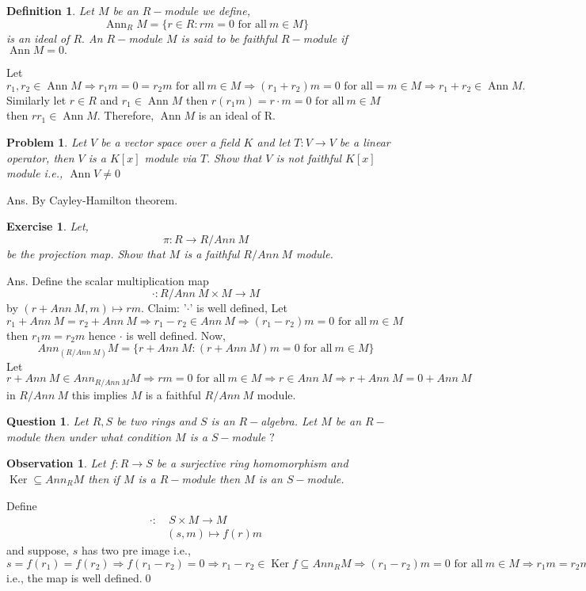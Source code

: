 \documentclass[11pt]{amsart}
\newtheorem{definition}[theorem]{Definition}%
\newtheorem{qns}[theorem]{Question}
\newtheorem{problem}[theorem]{Problem}
\newtheorem{ex}[theorem]{Exercise}
\newtheorem{obs}[theorem]{Observation}
\begin{document}
\begin{definition}
Let $M$ be an $R-$module we define, $$\operatorname{Ann}_R M=\{r\in R:rm=0\text{~for all}~ m\in M\}$$ is an ideal of $R.$ An $R-$module $M$ is said to be faithful $R-$module if $\operatorname{Ann}M=0.$
\end{definition}
Let $r_1,r_2\in \operatorname{Ann}M \Rightarrow r_1m=0=r_2m \text{~for all}~ m\in M \Rightarrow (r_1+r_2)m=0 \text{~for all}= m\in M \Rightarrow r_1+r_2\in \operatorname{Ann}M.$ Similarly let $r\in R$ and $r_1\in \operatorname{Ann}M$ then $r(r_1m)=r\cdot m=0\text{~for all}~ m\in M$ then $rr_1\in \operatorname{Ann}M.$ Therefore, $\operatorname{Ann}M$ is an ideal of R.
\begin{problem}
Let $V$ be a vector space over a field $K$ and let $T:V\to V$ be a linear operator, then $V$ is a $K[x]$ module via $T.$ Show that $V$ is not faithful $K[x]$ module i.e., $\operatorname{Ann}V\neq 0$
\end{problem}
Ans. By Cayley-Hamilton theorem.
\begin{ex}
Let, $$\pi: R\to R/Ann~M$$ be the projection map. Show that $M$ is a faithful $R/Ann~M$ module.
\end{ex}
Ans. Define the scalar multiplication map $$\cdot :R/Ann~M\times M\to M$$ by $(r+Ann~M,m)\mapsto rm.$ Claim: '$\cdot$' is well defined, Let $r_1+Ann~M=r_2+Ann~M \Rightarrow r_1-r_2\in Ann~M \Rightarrow (r_1-r_2)m=0\text{~for all}~ m\in M$ then $r_1m=r_2m$ hence $\cdot$ is well defined. Now, $$Ann_{(R/Ann~M)}M=\{r+Ann~M:(r+Ann~M)m=0 \text{~for all}~ m\in M\}$$ Let $r+Ann~M\in Ann_{R/Ann~M}M \Rightarrow rm=0 \text{~for all}~ m\in M \Rightarrow r\in Ann~M \Rightarrow r+Ann~M=0+Ann~M$ in $R/Ann~M$ this implies $M$ is a faithful $R/Ann~M$ module. 
\begin{qns}
Let $R,S$ be two rings and $S$ is an $R-$algebra. Let $M$ be an $R-$module then under what condition $M$ is a $S-$module $?$
\end{qns}
\begin{obs}
Let $f:R \to S$ be a surjective ring homomorphism and $\operatorname{Ker}\subseteq Ann_R M$ then if $M$ is a $R-$module then $M$ is an $S-$module.
\end{obs}
\proof Define \begin{align*}
\cdot: &~S\times M\to M\\
&(s,m)\mapsto f(r)m
\end{align*}
and suppose, $s$ has two pre image i.e., $s=f(r_1)=f(r_2) \Rightarrow f(r_1-r_2)=0 \Rightarrow r_1-r_2\in \operatorname{Ker}f\subseteq Ann_R M \Rightarrow (r_1-r_2)m=0 \text{~for all}~ m\in M \Rightarrow r_1m=r_2m$ i.e., the map is well defined.\qed
\end{document}
